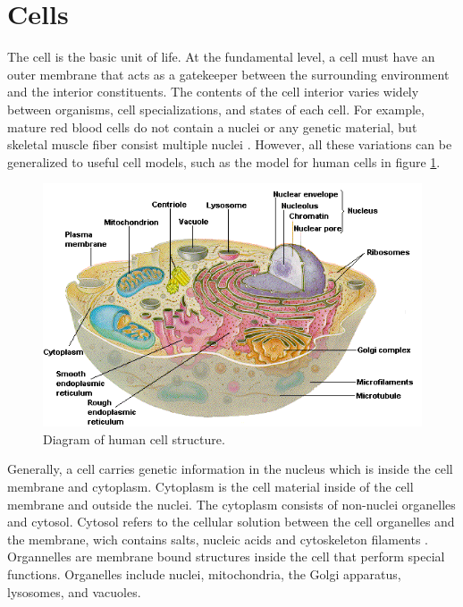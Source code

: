 

\section{Cells}
\par The cell is the basic unit of life. At the fundamental level, a cell must have an outer membrane that acts as a gatekeeper between the surrounding environment and the interior constituents. The contents of the cell interior varies widely between organisms, cell specializations, and states of each cell. For example, mature red blood cells do not contain a nuclei or any genetic material, but skeletal muscle fiber consist multiple nuclei \cite{daniel_d_chiras_human_2005}. However, all these variations can be generalized to useful cell models, such as the model for human cells in figure \ref{fig:human_cell_model}.   
\begin{figure}[ht]
 \centering
 \includegraphics[width=\textwidth]{images/humanCellOverview.png}
 \caption[Diagram of human cell structure.]{Diagram of human cell structure. \cite{daniel_d_chiras_human_2005} }
 \label{fig:human_cell_model}
 \end{figure}
 
 \par Generally, a cell carries genetic information in the nucleus which is inside the cell membrane and cytoplasm. Cytoplasm is the cell material inside of the cell membrane and outside the nuclei. The cytoplasm consists of non-nuclei organelles and cytosol.  Cytosol refers to the cellular solution between the cell organelles and the membrane, wich contains salts, nucleic acids and cytoskeleton filaments \cite{daniel_d_chiras_human_2005}. Organnelles are membrane bound structures inside the cell that perform special functions. Organelles include nuclei, mitochondria, the Golgi apparatus, lysosomes, and vacuoles.  
 
